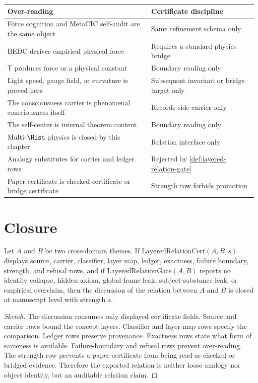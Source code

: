 \begin{longtable}{p{}p{}}
\toprule
\textbf{Over-reading} & \textbf{Certificate discipline} \\
\midrule
Force cognition and MetaCIC self-audit are the same object & Same refinement schema only \\
BEDC derives empirical physical force & Requires a standard-physics bridge \\
$\mathsf{T}$ produces force or a physical constant & Boundary reading only \\
Light speed, gauge field, or curvature is proved here & Subsequent invariant or bridge target only \\
The consciousness carrier is phenomenal consciousness itself & Records-side carrier only \\
The self-center is internal theorem content & Boundary reading only \\
Multi-$\Hist$ physics is closed by this chapter & Relation interface only \\
Analogy substitutes for carrier and ledger rows & Rejected by \autoref{def:layered-relation-gate} \\
Paper certificate is checked certificate or bridge certificate & Strength row forbids promotion \\
\bottomrule
\end{longtable}

\section{Closure}
\label{sec:layered-relation-closure}

\begin{theorem}
\label{thm:layered-relation-closed-discussion}
Let $A$ and $B$ be two cross-domain themes. If $\mathrm{LayeredRelationCert}(A,B,s)$ displays source, carrier, classifier, layer map, ledger, exactness, failure boundary, strength, and refusal rows, and if $\mathrm{LayeredRelationGate}(A,B)$ reports no identity collapse, hidden axiom, global-frame leak, subject-substance leak, or empirical overclaim, then the discussion of the relation between $A$ and $B$ is closed at manuscript level with strength $s$.
\end{theorem}
\begin{proof}[Sketch]
The discussion consumes only displayed certificate fields. Source and carrier rows bound the concept layers. Classifier and layer-map rows specify the comparison. Ledger rows preserve provenance. Exactness rows state what form of sameness is available. Failure-boundary and refusal rows prevent over-reading. The strength row prevents a paper certificate from being read as checked or bridged evidence. Therefore the exported relation is neither loose analogy nor object identity, but an auditable relation claim.
\end{proof}

